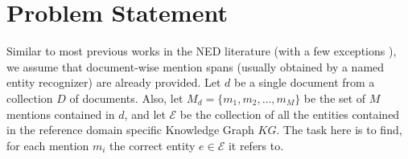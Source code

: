 \documentclass[11pt]{article}
\begin{document}






\section{Problem Statement}
Similar to most previous works in the NED literature (with a few exceptions \cite{kolitsas2018end, sil2013re}), we assume that document-wise mention spans
(usually obtained by a named entity recognizer) are already
provided.
Let $d$ be a single document from a collection $D$ of documents.
Also, let $M_d = \{m_1, m_2, \ldots , m_M\}$
be the set of $M$ mentions contained in $d$, and let $\mathcal{E}$
be the collection of all the entities contained in the reference domain specific Knowledge Graph $KG$. The task here is to find, for each mention $m_i$ the correct entity $e \in \mathcal{E}$ it refers to.
\end{document}
